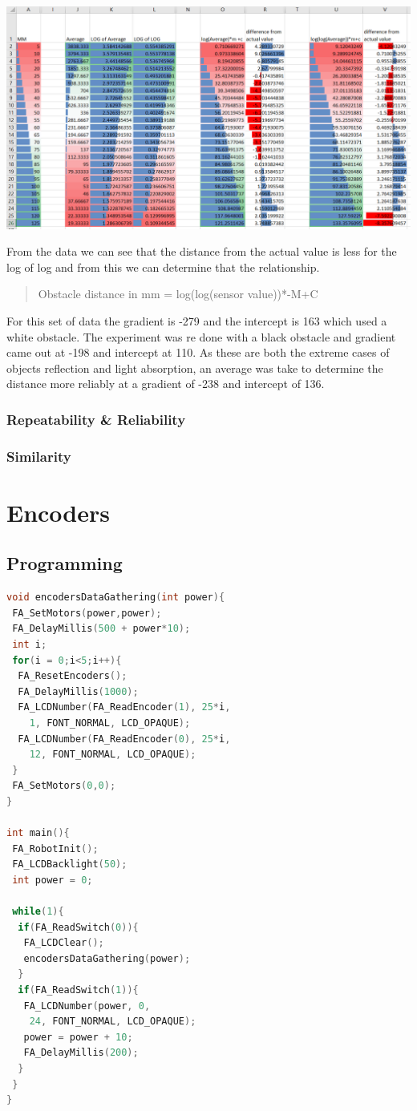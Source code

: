 \documentclass[11pt,a4paper,titlepage]{article}
\begin{document}
		\includegraphics[width=\textwidth,height=\textheight,keepaspectratio]{irRangeLineData}
		
		From the data we can see that the distance from the actual value is less for the log of log and from this we can determine that the relationship.
		\begin{quotation}
			Obstacle distance in mm = log(log(sensor value))*-M+C
		\end{quotation}
		For this set of data the gradient is -279 and the intercept is 163 which used a white obstacle. The experiment was re done with a black obstacle and gradient came out at -198 and intercept at 110. As these are both the extreme cases of objects reflection and light absorption, an average was take to determine the distance more reliably at a gradient of -238 and intercept of 136.
	\subsubsection{Repeatability \& Reliability}
	\subsubsection{Similarity}

\section{Encoders}
\subsection{Programming}
\begin{lstlisting}[language=C,frame=single]
void encodersDataGathering(int power){
 FA_SetMotors(power,power);
 FA_DelayMillis(500 + power*10);
 int i;
 for(i = 0;i<5;i++){
  FA_ResetEncoders();
  FA_DelayMillis(1000);
  FA_LCDNumber(FA_ReadEncoder(1), 25*i, 
    1, FONT_NORMAL, LCD_OPAQUE);
  FA_LCDNumber(FA_ReadEncoder(0), 25*i, 
    12, FONT_NORMAL, LCD_OPAQUE);
 }
 FA_SetMotors(0,0);
}

int main(){
 FA_RobotInit();
 FA_LCDBacklight(50);
 int power = 0;

 while(1){  
  if(FA_ReadSwitch(0)){
   FA_LCDClear();
   encodersDataGathering(power);
  }
  if(FA_ReadSwitch(1)){
   FA_LCDNumber(power, 0, 
    24, FONT_NORMAL, LCD_OPAQUE);
   power = power + 10;
   FA_DelayMillis(200);
  }
 }
}

\end{lstlisting}
\end{document}
